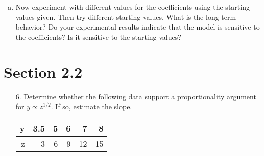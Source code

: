 \documentclass[10pt]{report}
\begin{document}
\begin{enumerate}
\begin{enumerate}[a.]
		\item 
		Now experiment with different values for the coefficients using the starting values given. Then try different starting values. What is the long-term behavior? Do your experimental results indicate that the model is sensitive to the coefficients? Is it sensitive to the starting values?
	\end{enumerate}
	
\end{enumerate}

\section*{Section 2.2}
\begin{enumerate}
	\item [6.]
	Determine whether the following data support a proportionality argument for $y\propto z^{1/2}$. If so, estimate the slope.
	\begin{table}[H]
		\centering
		\begin{tabular}{*{6}{N}} 
			\toprule
			y & 3.5 & 5 & 6 & 7 & 8 \\ \midrule
			z & 3 & 6 & 9 & 12 & 15 \\
			\bottomrule
		\end{tabular}
	\end{table}
\end{enumerate}
\end{document}
